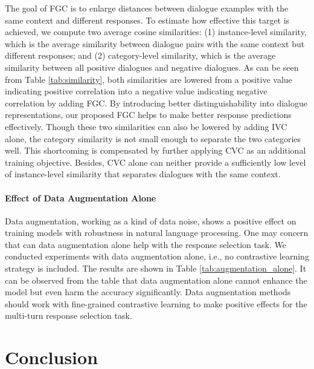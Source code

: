 \documentclass[letterpaper]{article} \usepackage{aaai22}  \usepackage{times}  \usepackage{helvet}  \usepackage{courier}  \usepackage[hyphens]{url}  \usepackage{graphicx} \urlstyle{rm} \def\UrlFont{\rm}  \usepackage{natbib}  \usepackage{caption} \DeclareCaptionStyle{ruled}{labelfont=normalfont,labelsep=colon,strut=off} \frenchspacing  \setlength{\pdfpagewidth}{8.5in}  \setlength{\pdfpageheight}{11in}  \usepackage{algorithm}
\begin{document}
The goal of FGC is to enlarge distances between dialogue examples with the same context and different responses. To estimate how effective this target is achieved, we compute two average cosine similarities: (1) instance-level similarity, which is the average similarity between dialogue pairs with the same context but different responses; and (2) category-level similarity, which is the average similarity between all positive dialogues and negative dialogues. As can be seen from Table \ref{tab:similarity}, both similarities are lowered from a positive value indicating positive correlation into a negative value indicating negative correlation by adding FGC. By introducing better distinguishability into dialogue representations, our proposed FGC helps to make better response predictions effectively. Though these two similarities can also be lowered by adding IVC alone, the category similarity is not small enough to separate the two categories well. This shortcoming is compensated by further applying CVC as an additional training objective.
Besides, CVC alone can neither provide a sufficiently low level of instance-level similarity that separates dialogues with the same context.

\paragraph{Effect of Data Augmentation Alone}
Data augmentation, working as a kind of data noise, shows a positive effect on training models with robustness in natural language processing. One may concern that can data augmentation alone help with the response selection task. We conducted experiments with data augmentation alone, i.e., no contrastive learning strategy is included. The results are shown in Table \ref{tab:augmentation_alone}. It can be observed from the table that data augmentation alone cannot enhance the model but even harm the accuracy significantly.
Data augmentation methods should work with fine-grained contrastive learning to make positive effects for the multi-turn response selection task.

\begin{table}[htbp]
\centering
{}
\caption{Model performance with data augmentation alone.}
\label{tab:augmentation_alone}
\end{table} \section{Conclusion}
\end{document}
